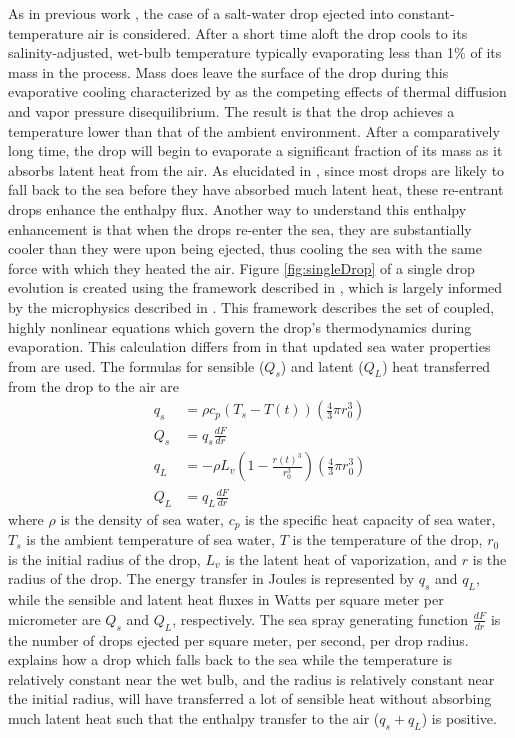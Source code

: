 \documentclass[10pt,a4paper]{article}
\begin{document}
As in previous work \citep{Andreas1990,Andreas2001}, the case of a salt-water drop ejected into constant-temperature air is considered. After a short time aloft the drop cools to its salinity-adjusted, wet-bulb temperature typically evaporating less than 1\% of its mass in the process. Mass does leave the surface of the drop during this evaporative cooling characterized by as the competing effects of thermal diffusion and vapor pressure disequilibrium. The result is that the drop achieves a temperature lower than that of the ambient environment. After a comparatively long time, the drop will begin to evaporate a significant fraction of its mass as it absorbs latent heat from the air. As elucidated in \citet{Andreas2001}, since most drops are likely to fall back to the sea before they have absorbed much latent heat, these re-entrant drops enhance the enthalpy flux. Another way to understand this enthalpy enhancement is that when the drops re-enter the sea, they are substantially cooler than they were upon being ejected, thus cooling the sea with the same force with which they heated the air. Figure \ref{fig:singleDrop} of a single drop evolution is created using the framework described in \citet{Andreas1990}, which is largely informed by the microphysics described in \citet{Pruppacher1978}. This framework describes the set of coupled, highly nonlinear equations which govern the drop's thermodynamics during evaporation. This calculation differs from \citet{Andreas1990} in that updated sea water properties from \citet{Nayar2016} are used. The formulas for sensible ($Q_s$) and latent ($Q_L$) heat transferred from the drop to the air are
\begin{align}
q_s &= \rho c_p \left(T_s - T(t)\right)\left(\frac{4}{3}\pi r_0^3\right)\\
Q_s &= q_s \frac{dF}{dr}\label{eq:Qs}\\
q_L &= -\rho L_v \left(1 - \frac{r(t)^3}{r_0^3}\right)\left(\frac{4}{3}\pi r_0^3\right)\\
Q_L &= q_L \frac{dF}{dr}\label{eq:QL}
\end{align}
where $\rho$ is the density of sea water, $c_p$ is the specific heat capacity of sea water, $T_s$ is the ambient temperature of sea water, $T$ is the temperature of the drop, $r_0$ is the initial radius of the drop, $L_v$ is the latent heat of vaporization, and $r$ is the radius of the drop. The energy transfer in Joules is represented by $q_s$ and $q_L$, while the sensible and latent heat fluxes in Watts per square meter per micrometer are $Q_s$ and $Q_L$, respectively. The sea spray generating function $\frac{dF}{dr}$ is the number of drops ejected per square meter, per second, per drop radius. \citet{Andreas2001} explains how a drop which falls back to the sea while the temperature is relatively constant near the wet bulb, and the radius is relatively constant near the initial radius, will have transferred a lot of sensible heat without absorbing much latent heat such that the enthalpy transfer to the air ($q_s+q_L$) is positive.
\end{document}

